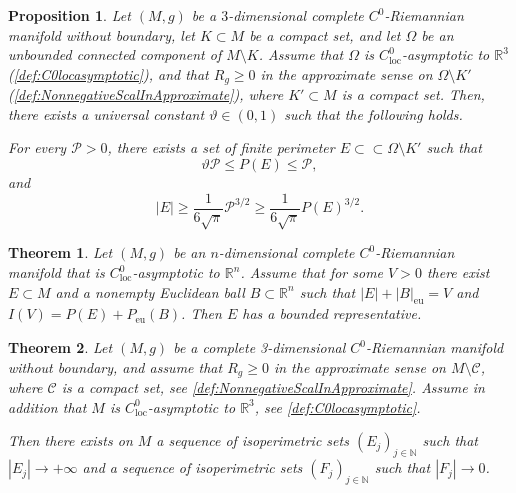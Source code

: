 \documentclass[10pt,a4paper]{amsart}
\newtheorem{theorem}{Theorem}
\newtheorem{proposition}{Proposition}
\newcommand{\R}{\mathbb{R}}
\newcommand{\abs}[1]{\left\lvert#1\right\rvert}
\begin{document}
\begin{proposition}\label{prop:GrossiQuantoVoglio}
    Let $(M,g)$ be a $3$-dimensional complete $C^0$-Riemannian manifold without boundary, let $K\subset M$ be a compact set, and let $\Omega$ be an unbounded connected component of $M\setminus K$. Assume that $\Omega$ is $C^0_{\mathrm{loc}}$-asymptotic to $\mathbb R^3$ (\cref{def:C0locasymptotic}), and that $R_g\geq 0$ in the approximate sense on $\Omega\setminus K'$ (\cref{def:NonnegativeScalInApproximate}), where $K'\subset M$ is a compact set. Then, there exists a universal constant $\vartheta\in(0,1)$ such that the following holds.
    
    For every $\mathscr{P}>0$, there exists a set of finite perimeter $E\subset\subset \Omega\setminus K'$ such that
    \[
    \vartheta \mathscr{P}\leq P(E)\leq \mathscr{P},
    \]
    and
    \begin{equation}\label{eqn:IlControlloAlContrario}
    |E|\geq \frac{1}{6\sqrt{\pi}}\mathscr{P}^{3/2}\geq \frac{1}{6\sqrt{\pi}}P(E)^{3/2}.
    \end{equation}
\end{proposition}

\begin{theorem}\label{thm:BoundedIsoperimetricResidues}
  Let $(M, g)$ be an $n$-dimensional complete $C^0$-Riemannian manifold that is $C^0_{\mathrm{loc}}$-asymptotic to $\mathbb R^n$. Assume that for some $V > 0$ there exist $E\subset M$ and a nonempty Euclidean ball $B \subset \R^n$ such that $\abs{E} + \abs{B}_{\mathrm{eu}} = V$ and $I(V) = P(E) + P_{\mathrm{eu}}(B)$. Then $E$ has a bounded representative.
\end{theorem}

\begin{theorem}\label{thm:CorIsop}
Let $(M,g)$ be a complete 3-dimensional $C^0$-Riemannian manifold without boundary, and assume that $R_{g}\geq 0$ in the approximate sense on $M\setminus \mathcal{C}$, where $\mathcal{C}$ is a compact set, see \cref{def:NonnegativeScalInApproximate}. Assume in addition that $M$ is $C^0_{\mathrm{loc}}$-asymptotic to $\mathbb R^3$, see \cref{def:C0locasymptotic}.

Then there exists on $M$ a sequence of isoperimetric sets $(E_j)_{j\in\mathbb N}$ such that $|E_j|\to +\infty$ and a sequence of isoperimetric sets $(F_j)_{j\in\mathbb N}$ such that $|F_j|\to 0$. 
\end{theorem}
\end{document}
